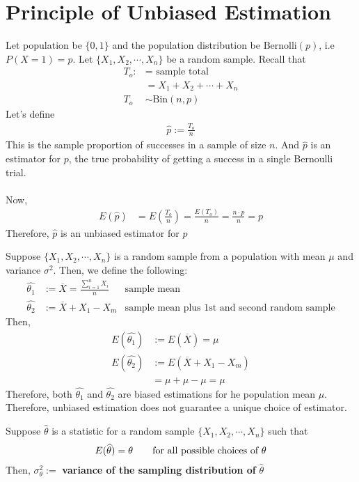 \section[Principle of Unbiased Estimation]{Principle of Unbiased Estimation}
\begin{ex}
Let population be $\{0,1\}$ and the population distribution be $\text{Bernolli}(p)$, i.e $P(X=1)=p$. Let $\{X_1,X_2,\cdots,X_n\}$ be a random sample. Recall that \begin{align*}
T_o:&=\text{ sample total}\\
&=X_1+X_2+\cdots+X_n\\
T_o&\sim \text{Bin}(n,p)
\end{align*}
Let's define \begin{align*}
\hat{p}:=\frac{T_o}{n}
\end{align*}
This is the sample proportion of successes in a sample of size $n$. And $\widehat{p}$ is an estimator for $p$, the true probability of getting a success in a single Bernoulli trial.\\
\hfill\\
Now, \begin{align*}
E(\widehat{p})&=E\left(\frac{T_o}{n} \right)=\frac{E(T_o)}{n}=\frac{n\cdot p}{n}=p
\end{align*}
Therefore, $\widehat{p}$ is an unbiased estimator for $p$
\end{ex}
\begin{ex}
Suppose $\{X_1,X_2,\cdots,X_n\}$ is a random sample from a population with mean $\mu$ and variance $\sigma^2$. Then, we define the following: \begin{align*}
\widehat{\theta_1}&:=\overline{X}=\frac{\sum_{i=1}^nX_i}{n} &\text{sample mean}\\
\widehat{\theta_2}&:=\overline{X}+X_1-X_m& \text{sample mean plus 1st and second random sample}
\end{align*}
Then, \begin{align*}
E(\widehat{\theta_1})&:=E(\overline{X})=\mu\\
E(\widehat{\theta_2})&:=E(\overline{X}+X_1-X_m)\\
&=\mu+\mu-\mu = \mu
\end{align*}
Therefore, both $\widehat{\theta_1}$ and $\widehat{\theta_2}$ are biased estimations for he population mean $\mu$. Therefore, unbiased estimation does not guarantee a unique choice of estimator.
\end{ex}
\begin{defn}
Suppose $\widehat{\theta}$ is a statistic for a random sample $\{X_1,X_2,\cdots,X_n\}$ such that \begin{align*}
E(\widehat{\theta})=\theta \text{\qquad for all possible choices of }\theta 
\end{align*}
Then, $\sigma_{\theta}^2:=$ \textbf{variance of the sampling distribution of }$\widehat{\theta}$
\end{defn}
